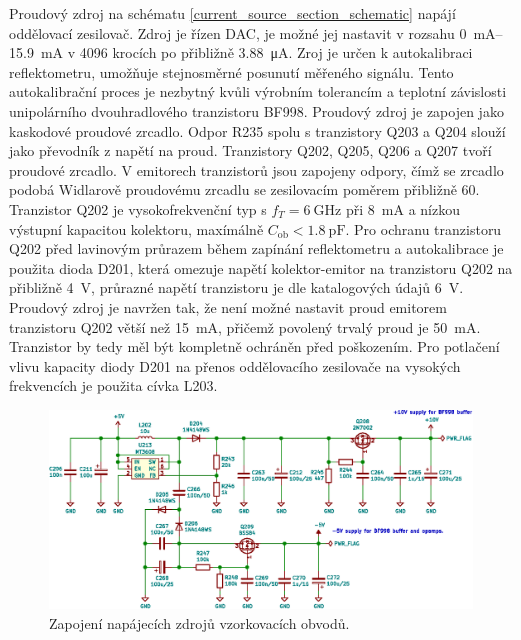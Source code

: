 Proudový zdroj na schématu \ref{current_source_section_schematic} napájí oddělovací zesilovač. Zdroj je řízen \acrshort{DAC}, je možné jej nastavit v rozsahu \SIrange{0}{15.9}{\si{mA}} v 4096 krocích po přibližně \SI{3.88}{\micro\ampere}. Zroj je určen k autokalibraci reflektometru, umožňuje stejnosměrné posunutí měřeného signálu. Tento autokalibrační proces je nezbytný kvůli výrobním tolerancím a teplotní závislosti unipolárního dvouhradlového tranzistoru BF998. Proudový zdroj je zapojen jako kaskodové proudové zrcadlo. Odpor R235 spolu s tranzistory Q203 a Q204 slouží jako převodník z napětí na proud. Tranzistory Q202, Q205, Q206 a Q207 tvoří proudové zrcadlo. V emitorech tranzistorů jsou zapojeny odpory, čímž se zrcadlo podobá Widlarově proudovému zrcadlu se zesilovacím poměrem přibližně 60. Tranzistor Q202 je vysokofrekvenční typ s $f_T=\SI{6}{\giga\hertz}$ při \SI{8}{\milli\ampere} a nízkou výstupní kapacitou kolektoru, maxímálně $C_\mathrm{ob}<\SI{1.8}{\pico\farad}$. Pro ochranu tranzistoru Q202 před lavinovým průrazem během zapínání reflektometru a autokalibrace je použita dioda D201, která omezuje napětí kolektor-emitor na tranzistoru Q202 na přibližně \SI{4}{\volt}, průrazné napětí tranzistoru je dle katalogových údajů \SI{6}{\volt}. Proudový zdroj je navržen tak, že není možné nastavit proud emitorem tranzistoru Q202 větší než \SI{15}{\milli\ampere}, přičemž povolený trvalý proud je \SI{50}{\milli\ampere}. Tranzistor by tedy měl být kompletně ochráněn před poškozením. Pro potlačení vlivu kapacity diody D201 na přenos oddělovacího zesilovače na vysokých frekvencích je použita cívka L203.

\begin{figure}[htbp]
\includegraphics[width=\textwidth,keepaspectratio]{images/power_supply_section.eps}\caption{Zapojení napájecích zdrojů vzorkovacích obvodů.}\label{analog_source_section_schematic}
\end{figure}

